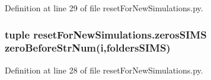 Definition at line 29 of file reset\-For\-New\-Simulations.\-py.

\hypertarget{namespacereset_for_new_simulations_a067f416fc59f243e38a0b8a40627979b}{
\subsubsection[{zeros\-S\-I\-M\-S}]{\setlength{\rightskip}{0pt plus 5cm}tuple reset\-For\-New\-Simulations.\-zeros\-S\-I\-M\-S {\bf zero\-Before\-Str\-Num}({\bf i},{\bf folders\-S\-I\-M\-S})}}\label{namespacereset_for_new_simulations_a067f416fc59f243e38a0b8a40627979b}


Definition at line 28 of file reset\-For\-New\-Simulations.\-py.

